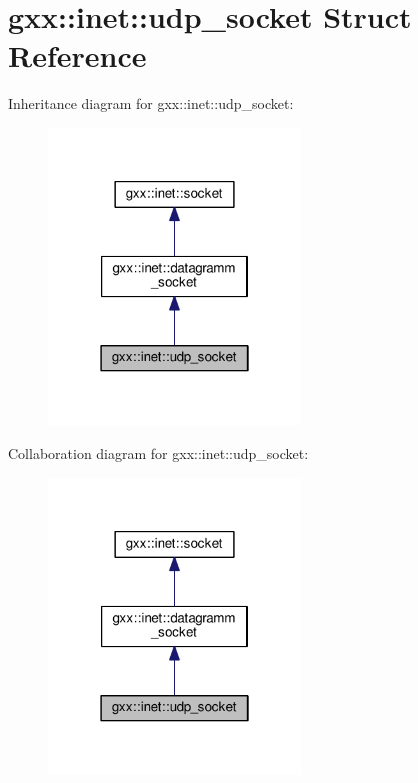 \hypertarget{structgxx_1_1inet_1_1udp__socket}{}\section{gxx\+:\+:inet\+:\+:udp\+\_\+socket Struct Reference}
\label{structgxx_1_1inet_1_1udp__socket}


Inheritance diagram for gxx\+:\+:inet\+:\+:udp\+\_\+socket\+:
\nopagebreak
\begin{figure}[H]
\begin{center}
\leavevmode
\includegraphics[width=190pt]{structgxx_1_1inet_1_1udp__socket__inherit__graph}
\end{center}
\end{figure}


Collaboration diagram for gxx\+:\+:inet\+:\+:udp\+\_\+socket\+:
\nopagebreak
\begin{figure}[H]
\begin{center}
\leavevmode
\includegraphics[width=190pt]{structgxx_1_1inet_1_1udp__socket__coll__graph}
\end{center}
\end{figure}

